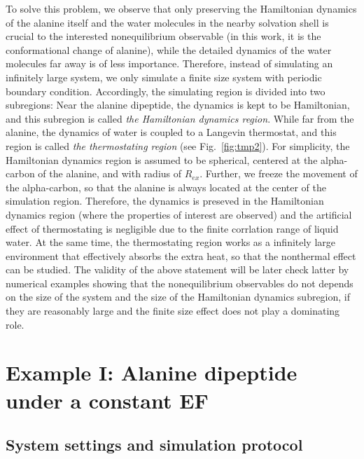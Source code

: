\documentclass[a4paper,preprint,unsortedaddress,onecolumn]{revtex4-1}
\begin{document}
To solve this problem, we
observe that only preserving the Hamiltonian dynamics of the alanine 
itself and the water molecules in the nearby solvation shell is
crucial to the interested nonequilibrium observable
(in this work, it is the conformational change of alanine),
while the detailed dynamics of
the water molecules far away is of less importance. 
Therefore, instead of simulating an infinitely
large system, we only simulate a finite size system with periodic
boundary condition. Accordingly, the simulating region is divided into two
subregions: Near the alanine dipeptide, the dynamics is kept to be
Hamiltonian, and this subregion is called \emph{the Hamiltonian dynamics
region}. While far from the alanine, the dynamics of water is coupled
to a Langevin thermostat, and this region is called \emph{the thermostating
region} (see Fig.~\ref{fig:tmp2}).  For simplicity, the Hamiltonian
dynamics region is assumed to be spherical, centered at the
alpha-carbon of the alanine, and with radius of $R_{ex}$.  Further, we
freeze the movement of the alpha-carbon, so that the alanine is always
located at the center of the simulation region.
Therefore, the dynamics is preseved in the Hamiltonian dynamics region (where the properties of interest are observed)
and the artificial effect of thermostating is negligible due to the finite corrlation
range of liquid water.
At the same time, the thermostating region works as a infinitely large
environment that effectively absorbs the extra heat, so that
the nonthermal effect can be studied.
The validity of the above
statement will be later check latter by numerical examples showing that the
nonequilibrium observables do not depends on the size of the system
and the size of the Hamiltonian dynamics subregion, if they are
reasonably large and the finite size effect does not play a dominating role.



\section{Example I: Alanine dipeptide
  under a constant EF}

\subsection{System settings and simulation protocol}
\end{document}
